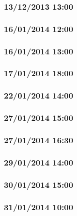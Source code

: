 \documentclass[a4paper,11pt]{article}
\begin{document}
\subsubsection{13/12/2013 13:00}

\clearpage
\subsubsection{16/01/2014 12:00}

\clearpage
\subsubsection{16/01/2014 13:00}

\clearpage
\subsubsection{17/01/2014 18:00}

\clearpage
\subsubsection{22/01/2014 14:00}

\clearpage
\subsubsection{27/01/2014 15:00}

\clearpage
\subsubsection{27/01/2014 16:30}

\clearpage
\subsubsection{29/01/2014 14:00}

\clearpage
\subsubsection{30/01/2014 15:00}

\clearpage
\subsubsection{31/01/2014 10:00}

\clearpage
\end{document}
